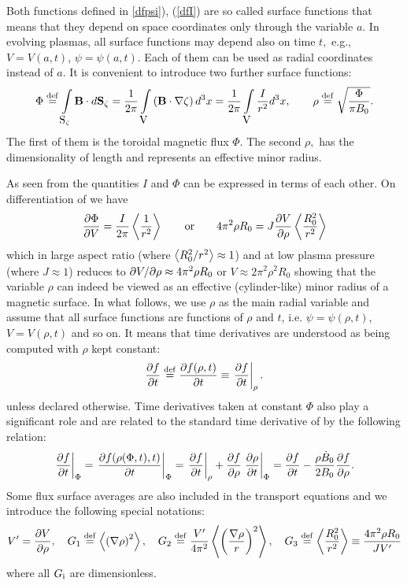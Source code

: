 Both functions defined in \eqs\ref{dfpsi}), (\ref{dfI}) are so called
surface functions that means that they depend on space
coordinates only through the variable $a$. 
In evolving plasmas, all surface functions may depend also on
time $t,$ e.g., $V=V(a,t)$, $\psi=\psi(a,t)$. 
Each of them can be used as radial coordinates instead of $a$. 
It is convenient to introduce two further surface functions: 
\begin{equation}
\label{dfPhi}
\Phi
\stackrel{{\rm def}}{=}\int\limits_{{\mbox{\cal S}}_\zeta}{\bf B}\cdot d{\bf S}_\zeta
=\frac{1}{2\pi}\int\limits_{\mbox{\cal V}}\left({\bf
B}\cdot\nabla\zeta\right) d^3x 
=\frac{1}{2\pi}\int\limits_{\mbox{\cal V}}\frac{I}{r^2} d^3x
,\qquad
\rho\stackrel{{\rm def}}{=}\sqrt{\Phi\over\pi B_0}
.\end{equation}
The first of them is the toroidal magnetic flux $\Phi.$ The second
$\rho,$ has the dimensionality of length and represents an effective
minor radius. 

As seen from  the quantities $I$ and $\Phi$ can be expressed
in terms of each other. 
On differentiation of  we have
\begin{equation}
\label{ident1}
\displaystyle{\partial \Phi\over\partial V}
=\frac{I}{2\pi}\left<\frac{1}{r^2}\right>
\qquad\mbox{or}\qquad
4\pi^2\rho R_0
=J\displaystyle{\partial V\over\partial \rho}\left<\frac{R_0^2}{r^2}\right>
\end{equation}
which in large aspect ratio (where $\left<R_0^2/r^2\right>\approx 1$) and at low
plasma pressure (where $J\approx 1$) reduces to
$\partial{V}/\partial{\rho}\approx 4\pi^2\rho R_0$ or 
$V\approx 2\pi^2\rho^2R_0$ showing that the variable $\rho$ can indeed
be viewed as an effective (cylinder-like) minor radius of a magnetic
surface. 
In what follows, we use $\rho$ as the main radial variable and assume
that all surface functions are functions of $\rho$ and $t$,
i.e. $\psi=\psi(\rho,t)$, $V=V(\rho,t)$ and so on. 
It means that time derivatives are understood as being computed with
$\rho$ kept constant: 
\begin{equation}\label{doverdt}
\displaystyle{\partial f\over\partial t}
\stackrel{{\rm def}}{=}\displaystyle{\partial f(\rho,t)\over\partial t}
\equiv
\left.\displaystyle{\partial f\over\partial t}\right|_\rho
.\end{equation}
unless declared otherwise. Time derivatives taken at
constant $\Phi$ also play a significant role and are related to the
standard time derivative of  by the following relation:  
\begin{equation}
\label{dtphi}
\left.\displaystyle{\partial f\over\partial t}\right|_\Phi
=\left.\displaystyle{\partial f(\rho(\Phi,t),t)\over\partial t}\right|_\Phi
=\left.\displaystyle{\partial f\over\partial t}\right|_\rho
+\displaystyle{\partial f\over\partial \rho}\left.\displaystyle{\partial \rho\over\partial t}\right|_\Phi
=\displaystyle{\partial f\over\partial t}
-\frac{\rho\dot B_0}{2B_0}\displaystyle{\partial f\over\partial \rho}
.\end{equation}
Some flux  surface averages are also included in the transport equations 
and we introduce the following special notations: 
\begin{equation}\label{metr}
V'=\displaystyle{\partial V\over\partial \rho}
,\quad
G_1\stackrel{{\rm def}}{=}\left<\left(\nabla \rho\right)^2\right>
,\quad
G_2\stackrel{{\rm def}}{=}\frac{V'}{4\pi^2}\left<\left(\frac{\nabla \rho}{r}\right)^2\right>
,\quad
G_3\stackrel{{\rm def}}{=}\left<\frac{R_0^2}{r^2}\right>
\equiv\frac{4\pi^2\rho R_0}{JV'}
\end{equation}
where all $G_{\rm i}$ are dimensionless.


